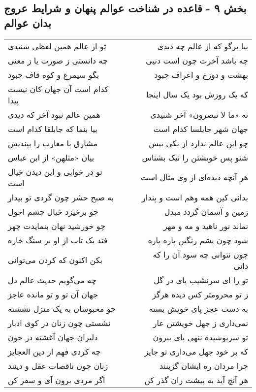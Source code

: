 \begin{center}
\section*{بخش ۹ - قاعده در شناخت عوالم پنهان و شرایط عروج بدان عوالم}
\label{sec:sh009}
\begin{longtable}{l p{0.5cm} r}
تو از عالم همین لفظی شنیدی
&&
بیا برگو که از عالم چه دیدی
\\
چه دانستی ز صورت یا ز معنی
&&
چه باشد آخرت چون است دنیی
\\
بگو سیمرغ و کوه قاف چبود
&&
بهشت و دوزخ و اعراف چبود
\\
کدام است آن جهان کان نیست پیدا
&&
که یک روزش بود یک سال اینجا
\\
همین عالم نبود آخر که دیدی
&&
نه «ما لا تبصرون» آخر شنیدی
\\
بیا بنما که جابلقا کدام است
&&
جهان شهر جابلسا کدام است
\\
مشارق با مغارب را بیندیش
&&
چو این عالم ندارد از یکی بیش
\\
بیان «مثلهن» از ابن عباس
&&
شنو پس خویشتن را نیک بشناس
\\
تو در خوابی و این دیدن خیال است
&&
هر آنچه دیده‌ای از وی مثال است
\\
به صبح حشر چون گردی تو بیدار
&&
بدانی کین همه وهم است و پندار
\\
چو برخیزد خیال چشم احول
&&
زمین و آسمان گردد مبدل
\\
چو خورشید نهان بنمایدت چهر
&&
نماند نور ناهید و مه و مهر
\\
فتد یک تاب از او بر سنگ خاره
&&
شود چون پشم رنگین پاره پاره
\\
بکن اکنون که کردن می‌توانی
&&
چون نتوانی چه سود آن را که دانی
\\
چه می‌گویم حدیث عالم دل
&&
تو را ای سرنشیب پای در گل
\\
جهان آن تو و تو مانده عاجز
&&
ز تو محرومتر کس دیده هرگز
\\
چو محبوسان به یک منزل نشسته
&&
به دست عجز پای خویش بسته
\\
نشستی چون زنان در کوی ادبار
&&
نمی‌داری ز جهل خویشتن عار
\\
دلیران جهان آغشته در خون
&&
تو سرپوشیده ننهی پای بیرون
\\
چه کردی فهم از دین العجایز
&&
که بر خود جهل می‌داری تو جایز
\\
زنان چون ناقصات عقل و دینند
&&
چرا مردان ره ایشان گزینند
\\
اگر مردی برون آی و سفر کن
&&
هر آنچ آید به پیشت زان گذر کن
\\

\end{longtable}
\end{center}
